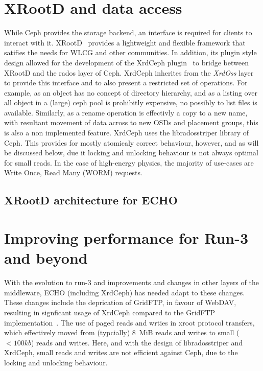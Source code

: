 \documentclass{webofc}
\begin{document}
\section{XRootD and data access\label{sec:xrd}}
While Ceph provides the storage backend, an interface is required for clients to interact with it. XRootD~\cite{xrootd} provides a lightweight and flexible framework that satifies the needs for WLCG and other communities. In addition, its plugin style design allowed for the development of the XrdCeph plugin~\cite{libradosstriper} to bridge between XRootD and the rados layer of Ceph. 
XrdCeph inherites from the {\em XrdOss} layer to provide this interface and to also present a restricted set of operations. For example, as an object has no concept of directory hierarchy, and as a listing over all object in a (large) ceph pool is prohibitly expensive, no possibly to list files is available. Similarly, as a rename operation is effectivly a copy to a new name, with resultant movement of data across to new OSDs and placement groups, this is also a non implemented feature. 
XrdCeph uses the libradosstriper library of Ceph. This provides for mostly atomicaly correct behaviour, however, and as will be discussed below, due it locking and unlocking behaviour is not always optimal for small reads. In the case of high-energy physics, the majority of use-cases are Write Once, Read Many (WORM) requests. 

\subsection{XRootD architecture for ECHO\label{xrootdsetup}}


\section{Improving performance for Run-3 and beyond\label{sec:requirements}}
With the evolution to run-3 and improvements and changes in other layers of the middleware, ECHO (including XrdCeph) has needed adapt to these changes. 
These changes include the deprication of GridFTP, in favour of WebDAV, resulting in signficant usage of XrdCeph compared to the GridFTP implementation~\cite{gridftpplugin,dewhurst2017deployment}. The use of paged reads and wrties in xroot protocol transfers, which effectively moved from (typcially) 8~MiB reads and writes to small ($<100kb$) reads and writes. Here, and with the design of libradosstriper and XrdCeph, small reads and writes are not efficient against Ceph, due to the locking and unlocking behaviour. 
\end{document}
